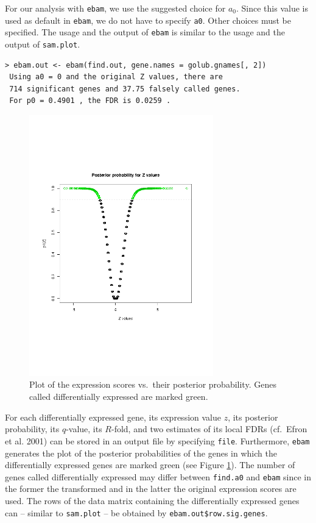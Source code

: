 \documentclass[a4paper]{article}
\renewcommand{\baselinestretch}{1.1}
\begin{document}
For our analysis with \texttt{ebam}, we use the suggested choice
for $a_0$. Since this value is used as default in
\texttt{ebam}, we do not have to specify \texttt{a0}. Other choices
must be specified. The usage
and the output of \texttt{ebam} is similar to the usage and the
output of \texttt{sam.plot}.

\begin{verbatim}
> ebam.out <- ebam(find.out, gene.names = golub.gnames[, 2])
 Using a0 = 0 and the original Z values, there are
 714 significant genes and 37.75 falsely called genes.
 For p0 = 0.4901 , the FDR is 0.0259 .
\end{verbatim}

\begin{figure}[!ht]
\small \renewcommand{\baselinestretch}{1.2}
\centerline{
\includegraphics[width=8cm]{ebam}}\vspace{-12pt}
\caption{Plot of the expression scores vs.\ their posterior
probability. Genes called differentially expressed are marked
green.}\label{ebam}\vspace{18pt}
\end{figure}


For each differentially expressed gene, its
expression value $z$, its posterior probability, its $q$-value,
its $R$-fold, and two estimates of its local FDRs (cf.\ Efron et
al. 2001) can be stored in an output file by specifying \texttt{file}. Furthermore,
\texttt{ebam} generates the plot of the posterior probabilities of
the genes in which the differentially expressed genes are marked
green (see Figure \ref{ebam}). The number of genes called differentially
expressed may differ between \texttt{find.a0} and \texttt{ebam}
since in the former the transformed and in the latter the original
expression scores are used. The rows of the data matrix containing
the differentially expressed genes can -- similar to
\texttt{sam.plot} -- be obtained by \texttt{ebam.out\$row.sig.genes}.
\end{document}
